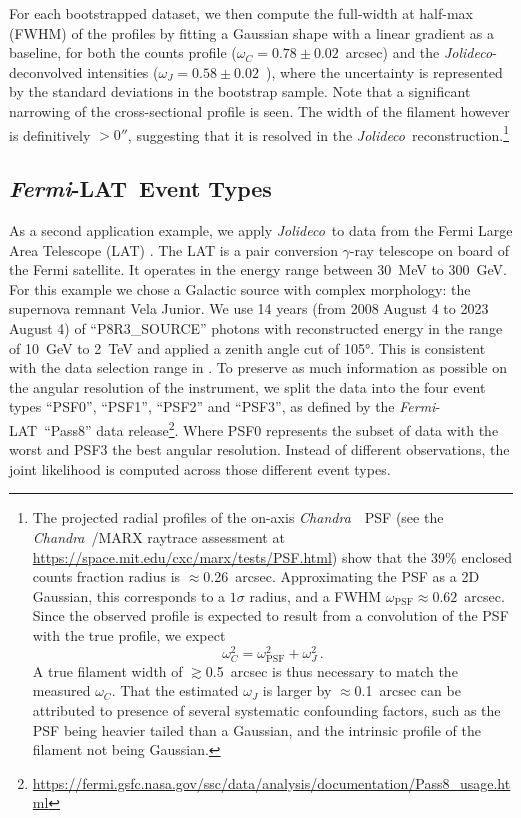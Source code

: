\documentclass[twocolumn, lineno]{aastex631}
\newcommand{\chandra}{\textit{Chandra}~}
\newcommand{\fermi}{\textit{Fermi}-LAT~}
\newcommand{\jolideco}{\textit{Jolideco}~}
\newcommand{\jolideconospace}{\textit{Jolideco}}
\newcommand{\gammaray}{$\gamma$-ray\xspace}
\begin{document}
    For each bootstrapped dataset, we then compute the full-width at half-max (FWHM) of the profiles by fitting a Gaussian shape with a linear gradient as a baseline, for both the counts profile ($\omega_C=0.78{\pm}0.02$~arcsec) and the \jolideconospace-deconvolved intensities ($\omega_J=0.58{\pm}0.02$~\arcsec), where the uncertainty is represented by the standard deviations in the bootstrap sample.  Note that a significant narrowing of the cross-sectional profile is seen.  The width of the filament however is definitively $>0''$, suggesting that it is resolved in the \jolideconospace\ reconstruction.\footnote{The projected radial profiles of the on-axis \chandra\ PSF (see the \chandra/MARX raytrace assessment at \url{https://space.mit.edu/cxc/marx/tests/PSF.html}) show that the 39\% enclosed counts fraction radius is $\approx$0.26~arcsec.  Approximating the PSF as a 2D Gaussian, this corresponds to a $1\sigma$ radius, and a FWHM $\omega_{\textrm{PSF}}{\approx}0.62$~arcsec.  Since the observed profile is expected to result from a convolution of the PSF with the true profile, we expect
    $$\omega_C^2 = \omega_{\textrm{PSF}}^2+\omega_J^2 \,.$$  
    A true filament width of $\gtrsim$0.5~arcsec is thus necessary to match the measured $\omega_C$.  That the estimated $\omega_J$ is larger by $\approx$0.1~arcsec can be attributed to presence of several systematic confounding factors, such as the PSF being heavier tailed than a Gaussian, and the intrinsic profile of the filament not being Gaussian.}
    
    \subsection{\fermi Event Types}
    \label{sec:fermi-lat-example}
     As a second application example, we apply \jolideco  to data from the Fermi Large Area Telescope (LAT) \citep{Atwood2009}. The LAT is a pair conversion \gammaray telescope on board of the Fermi satellite. It operates in the energy range between \qty[mode = text]{30}{MeV} to  \qty[mode = text]{300}{GeV}. For this example we chose  a Galactic source with complex morphology: the supernova remnant Vela Junior. We use 14 years (from 2008 August 4 to 2023 August 4) of \enquote{P8R3\_SOURCE} photons with reconstructed energy in the range of \qty[mode = text]{10}{GeV} to \qty[mode = text]{2}{TeV} and applied a zenith angle cut of \ang{105}. This is consistent with the data selection range in \cite{Ackermann2017}. To preserve as much information as possible on the angular resolution of the instrument, we split the data into the four event types \enquote{PSF0}, \enquote{PSF1}, \enquote{PSF2} and \enquote{PSF3}, as defined by the \fermi \enquote{Pass8} data release\footnote{\url{https://fermi.gsfc.nasa.gov/ssc/data/analysis/documentation/Pass8_usage.html}}. Where PSF0 represents the subset of data with the worst and PSF3 the best angular resolution. Instead of different observations, the joint likelihood is computed across those different event types.
     
\end{document}
